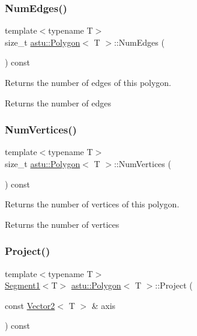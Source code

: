 \subsubsection{\texorpdfstring{Num\+Edges()}{NumEdges()}}
{\footnotesize\ttfamily template$<$typename T$>$ \\
size\+\_\+t \hyperlink{classastu_1_1Polygon}{astu\+::\+Polygon}$<$ T $>$\+::Num\+Edges (\begin{DoxyParamCaption}{ }\end{DoxyParamCaption}) const\hspace{0.3cm}{\ttfamily [inline]}}

Returns the number of edges of this polygon.

\begin{DoxyReturn}{Returns}
the number of edges 
\end{DoxyReturn}
\mbox{\label{classastu_1_1Polygon_aaabad8e95da96f4fa2e8d0fd79804afa}} 
\subsubsection{\texorpdfstring{Num\+Vertices()}{NumVertices()}}
{\footnotesize\ttfamily template$<$typename T$>$ \\
size\+\_\+t \hyperlink{classastu_1_1Polygon}{astu\+::\+Polygon}$<$ T $>$\+::Num\+Vertices (\begin{DoxyParamCaption}{ }\end{DoxyParamCaption}) const\hspace{0.3cm}{\ttfamily [inline]}}

Returns the number of vertices of this polygon.

\begin{DoxyReturn}{Returns}
the number of vertices 
\end{DoxyReturn}
\mbox{\label{classastu_1_1Polygon_a5e449c044ceeeb1e459dbb00a301254c}} 
\subsubsection{\texorpdfstring{Project()}{Project()}}
{\footnotesize\ttfamily template$<$typename T$>$ \\
\hyperlink{classastu_1_1Segment1}{Segment1}$<$T$>$ \hyperlink{classastu_1_1Polygon}{astu\+::\+Polygon}$<$ T $>$\+::Project (\begin{DoxyParamCaption}\item[{const \hyperlink{classastu_1_1Vector2}{Vector2}$<$ T $>$ \&}]{axis }\end{DoxyParamCaption}) const\hspace{0.3cm}{\ttfamily [inline]}}


